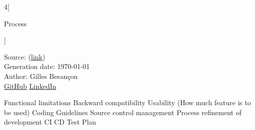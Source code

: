 \documentclass[10pt,landscape]{article}
\begin{document}
  \raggedright
  \footnotesize
  \begin{multicols}{4}[
    \begin{center}
      \Huge{Process}
    \end{center}
  ]
  
    \setlength{\premulticols}{1pt}
    \setlength{\postmulticols}{1pt}
    \setlength{\multicolsep}{1pt}
    \setlength{\columnsep}{2pt}


    \scriptsize
    Source: (\href{https://github.com/gbesancon/cheatsheet}{link})\\
    Generation date: \today\\
    Author: Gilles Besan\c{c}on\\
    \href{https://github.com/gbesancon/cheatsheet}{GitHub} \href{https://www.linkedin.com/in/gbesancon}{LinkedIn}\\
  \end{multicols}
  
  
  Functional limitations
  Backward compatibility
  Usability (How much feature is to be used)
  Coding Guidelines
  Source control management
  Process refinement of development
  CI
  CD
  Test Plan
\end{document}
